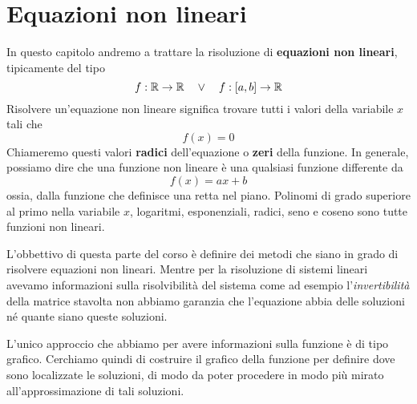 \chapter{Equazioni non lineari}
In questo capitolo andremo a trattare la risoluzione di \textbf{equazioni non lineari}, tipicamente del tipo
\[ f : \mathbb{R} \to \mathbb{R} \quad \vee \quad f : [a, b] \to \mathbb{R} \]
Risolvere un'equazione non lineare significa trovare tutti i valori della variabile $x$ tali che
\[ f(x) = 0 \]
Chiameremo questi valori \textbf{radici} dell'equazione o \textbf{zeri} della funzione. In generale, possiamo
dire che una funzione non lineare è una qualsiasi funzione differente da
\[ f(x) = a x + b \]
ossia, dalla funzione che definisce una retta nel piano. Polinomi di grado superiore al primo nella variabile
$x$, logaritmi, esponenziali, radici, seno e coseno sono tutte funzioni non lineari.

L'obbettivo di questa parte del corso è definire dei metodi che siano in grado di risolvere equazioni non
lineari. Mentre per la risoluzione di sistemi lineari avevamo informazioni sulla risolvibilità del sistema
come ad esempio l'\emph{invertibilità} della matrice stavolta non abbiamo garanzia che l'equazione abbia
delle soluzioni né quante siano queste soluzioni.

L'unico approccio che abbiamo per avere informazioni sulla funzione è di tipo grafico. Cerchiamo quindi di
costruire il grafico della funzione per definire dove sono localizzate le soluzioni, di modo da poter procedere
in modo più mirato all'approssimazione di tali soluzioni.

